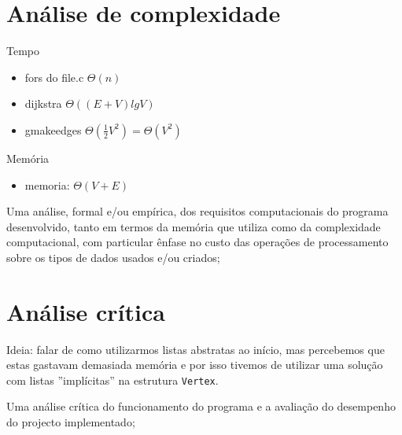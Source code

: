 \documentclass[a4paper, 18pt]{article}
\newcommand\tu[0]{\textunderscore}
\begin{document}
\section{Análise de complexidade}
	\par
	Tempo
	\begin{itemize}
		\item fors do file.c $\Theta(n)$
		\item dijkstra $\Theta((E+V) lg V)$
		\item g\tu make\tu edges $\Theta(\frac{1}{2}V^2) = \Theta(V^2)$
	\end{itemize}
	\par
	Memória
	\begin{itemize}
		\item memoria: $\Theta(V + E)$
	\end{itemize}
	\par
	Uma análise, formal e/ou empírica, dos requisitos computacionais do programa desenvolvido, tanto em termos da memória que utiliza como da complexidade computacional, com particular ênfase no custo das operações de processamento sobre os tipos de dados usados e/ou criados;

\section{Análise crítica}
\label{sec:analise}
	\par
	Ideia: falar de como utilizarmos listas abstratas ao início, mas percebemos que estas gastavam demasiada memória e por isso tivemos de utilizar uma solução com listas ''implícitas'' na estrutura \texttt{Vertex}.
	\par
	Uma análise crítica do funcionamento do programa e a avaliação do desempenho
do projecto implementado;
\end{document}
